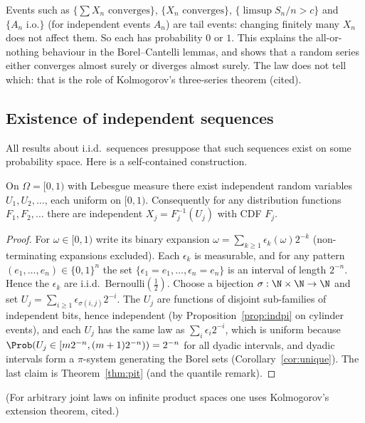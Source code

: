 \begin{example}[Applications]
Events such as $\{\sum X_n\text{ converges}\}$, $\{X_n\text{ converges}\}$,
$\{\limsup S_n/n>c\}$ and $\{A_n\text{ i.o.}\}$ (for independent events $A_n$) are tail events:
changing finitely many $X_n$ does not affect them. So each has probability $0$ or $1$. This
explains the all-or-nothing behaviour in the Borel--Cantelli lemmas, and shows that a
random series either converges almost surely or diverges almost surely. The law
does not tell which: that is the role of Kolmogorov's three-series theorem (cited).
\end{example}

\subsection*{Existence of independent sequences}

All results about i.i.d.\ sequences presuppose that such sequences exist on some probability
space. Here is a self-contained construction.

\begin{theorem}\label{thm:iidexist}
On $\Omega=[0,1)$ with Lebesgue measure there exist independent random variables
$U_1,U_2,\dots$, each uniform on $[0,1)$. Consequently for any distribution functions
$F_1,F_2,\dots$ there are independent $X_j=F_j^{-1}(U_j)$ with CDF $F_j$.
\end{theorem}
\begin{proof}
For $\omega\in[0,1)$ write its binary expansion $\omega=\sum_{k\ge1}\epsilon_k(\omega)2^{-k}$
(non-terminating expansions excluded). Each $\epsilon_k$ is measurable, and for any pattern
$(e_1,\dots,e_n)\in\{0,1\}^n$ the set $\{\epsilon_1=e_1,\dots,\epsilon_n=e_n\}$ is an interval
of length $2^{-n}$. Hence the $\epsilon_k$ are i.i.d.\ Bernoulli$(\tfrac12)$. Choose a bijection
$\sigma:\N\times\N\to\N$ and set $U_j=\sum_{i\ge1}\epsilon_{\sigma(i,j)}2^{-i}$. The $U_j$ are
functions of disjoint sub-families of independent bits, hence independent (by
Proposition~\ref{prop:indpi} on cylinder events), and each $U_j$ has the same law as
$\sum_i\epsilon_i2^{-i}$, which is uniform because
$\Prob(U_j\in[m2^{-n},(m+1)2^{-n}))=2^{-n}$ for all dyadic intervals, and dyadic intervals
form a $\pi$-system generating the Borel sets (Corollary~\ref{cor:unique}). The last
claim is Theorem~\ref{thm:pit} (and the quantile remark).
\end{proof}

(For arbitrary joint laws on infinite product spaces one uses Kolmogorov's extension
theorem, cited.)

